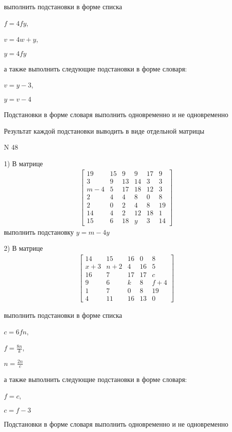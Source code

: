 \documentclass[11pt]{report}
\begin{document}
выполнить подстановки в форме списка

$f=4 f y$,

$v=4 w + y$,

$y=4 f y$

а также выполнить следующие подстановки в форме словаря:

$v=y - 3$,

$y=v - 4$


    Подстановки в форме словаря выполнить одновременно и не одновременно


    Результат каждой подстановки выводить в виде отдельной матрицы

\newpage
N 48


    1) В матрице
\begin{align*}
\left[\begin{matrix}19 & 15 & 9 & 9 & 17 & 9\\3 & 9 & 13 & 14 & 3 & 3\\m - 4 & 5 & 17 & 18 & 12 & 3\\2 & 4 & 4 & 8 & 0 & 8\\2 & 0 & 2 & 4 & 8 & 19\\14 & 4 & 2 & 12 & 18 & 1\\15 & 6 & 18 & y & 3 & 14\end{matrix}\right]
\end{align*}
выполнить подстановку $y=m - 4 y$


    2) В матрице
\begin{align*}
\left[\begin{matrix}14 & 15 & 16 & 0 & 8\\x + 3 & n + 2 & 4 & 16 & 5\\16 & 7 & 17 & 17 & c\\9 & 6 & k & 8 & f + 4\\1 & 7 & 0 & 8 & 19\\4 & 11 & 16 & 13 & 0\end{matrix}\right]
\end{align*}

выполнить подстановки в форме списка

$c=6 f n$,

$f=\frac{8 n}{k}$,

$n=\frac{2 n}{c}$

а также выполнить следующие подстановки в форме словаря:

$f=c$,

$c=f - 3$


    Подстановки в форме словаря выполнить одновременно и не одновременно
\end{document}
